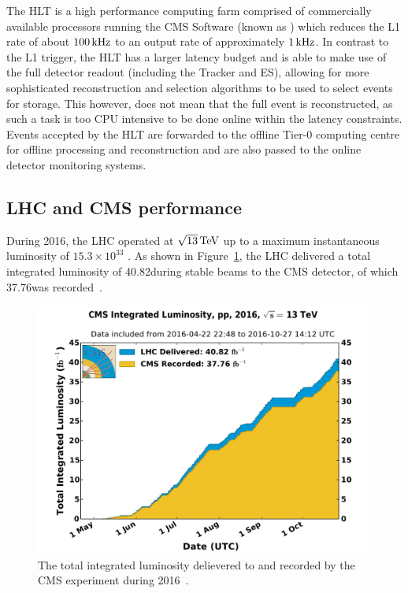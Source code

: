 The HLT is a high performance computing farm comprised of commercially available processors running the CMS Software (known as \CMSSW) which reduces the L1 rate of about $100\text{\,kHz}$ to an output rate of approximately $1\text{\,kHz}$.
In contrast to the L1 trigger, the HLT has a larger latency budget and is able to make use of the full detector readout (including the Tracker and ES), allowing for more sophisticated reconstruction and selection algorithms to be used to select events for storage.
This however, does not mean that the full event is reconstructed, as such a task is too CPU intensive to be done online within the latency constraints.
Events accepted by the HLT are forwarded to the offline Tier-0 computing centre for offline processing and reconstruction and are also passed to the online detector monitoring systems.

\subsection{LHC and CMS performance}\label{Lumi}
During 2016, the LHC operated at $\sqrt{13} \,\text{Te\hspace{-.08em}V}$ up to a maximum instantaneous luminosity of $15.3 \times 10^{33}$ \percms.
As shown in Figure~\ref{fig:cms_lumi}, the LHC delivered a total integrated luminosity of 40.82\fbinv during stable beams to the CMS detector, of which 37.76\fbinv was recorded~\cite{cmsLumiPage,CMS:2017_lumi}.
\begin{figure}[htbp]
\begin{center}
\includegraphics[width=0.99\textwidth]{figs/lhc/int_lumi_per_day_cumulative_pp_2016.pdf}
\caption{The total integrated luminosity delievered to and recorded by the CMS experiment during 2016~\cite{CMS:2017_lumi}.}
\label{fig:cms_lumi}
\end{center}
\end{figure}

